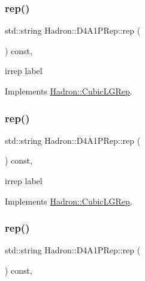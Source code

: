 \subsubsection{\texorpdfstring{rep()}{rep()}\hspace{0.1cm}{\footnotesize\ttfamily [1/3]}}
{\footnotesize\ttfamily std\+::string Hadron\+::\+D4\+A1\+P\+Rep\+::rep (\begin{DoxyParamCaption}{ }\end{DoxyParamCaption}) const\hspace{0.3cm}{\ttfamily [inline]}, {\ttfamily [virtual]}}

irrep label 

Implements \mbox{\hyperlink{structHadron_1_1CubicLGRep_a50f5ddbb8f4be4cee0106fa9e8c75e6c}{Hadron\+::\+Cubic\+L\+G\+Rep}}.

\mbox{\label{structHadron_1_1D4A1PRep_ab4f311aa3268628a8380e1e73c6023a1}} 
\subsubsection{\texorpdfstring{rep()}{rep()}\hspace{0.1cm}{\footnotesize\ttfamily [2/3]}}
{\footnotesize\ttfamily std\+::string Hadron\+::\+D4\+A1\+P\+Rep\+::rep (\begin{DoxyParamCaption}{ }\end{DoxyParamCaption}) const\hspace{0.3cm}{\ttfamily [inline]}, {\ttfamily [virtual]}}

irrep label 

Implements \mbox{\hyperlink{structHadron_1_1CubicLGRep_a50f5ddbb8f4be4cee0106fa9e8c75e6c}{Hadron\+::\+Cubic\+L\+G\+Rep}}.

\mbox{\label{structHadron_1_1D4A1PRep_ab4f311aa3268628a8380e1e73c6023a1}} 
\subsubsection{\texorpdfstring{rep()}{rep()}\hspace{0.1cm}{\footnotesize\ttfamily [3/3]}}
{\footnotesize\ttfamily std\+::string Hadron\+::\+D4\+A1\+P\+Rep\+::rep (\begin{DoxyParamCaption}{ }\end{DoxyParamCaption}) const\hspace{0.3cm}{\ttfamily [inline]}, {\ttfamily [virtual]}}

